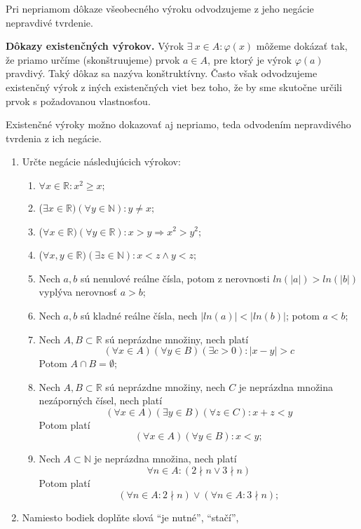 Pri nepriamom dôkaze všeobecného výroku odvodzujeme z jeho negácie nepravdivé tvrdenie.

\textbf{Dôkazy existenčných výrokov.} Výrok $\exists ~ x \in A: \varphi (x)$
môžeme dokázať tak, že priamo určíme (skonštruujeme) prvok $a \in A$, pre ktorý
je výrok $\varphi (a)$ pravdivý. Taký dôkaz sa nazýva konštruktívny. Často však
odvodzujeme existenčný výrok z iných existenčných viet bez toho, že by sme
skutočne určili prvok s požadovanou vlastnosťou.

Existenčné výroky možno dokazovať aj nepriamo, teda odvodením nepravdivého
tvrdenia z ich negácie.

\begin{enumerate}
  \item Určte negácie následujúcich výrokov:
  \begin{enumerate}[label=\arabic*.]
    \item $\forall x \in \mathbb{R} : x^2 \geq x;$
    \item ($\exists x \in \mathbb{R})(\forall y \in \mathbb{N}): y \neq x;$
    \item ($\forall x \in \mathbb{R})(\forall y \in \mathbb{R}):
          x > y \Rightarrow x^2 > y^2;$
    \item ($\forall x, y \in \mathbb{R})(\exists z \in \mathbb{N}):
          x < z \land y < z;$
    \item Nech $a, b$ sú nenulové reálne čísla, potom z nerovnosti
          $ln(|a|) > ln(|b|)$ vyplýva nerovnosť $a > b$;
    \item Nech $a, b$ sú kladné reálne čísla, nech $|ln(a)| < |ln(b)|$;
          potom $a < b$;
    \item Nech $A, B \subset \mathbb{R}$ sú neprázdne množiny, nech platí
          $$(\forall x \in A)(\forall y \in B)(\exists c > 0): |x - y| > c$$
          Potom $A \cap B = \emptyset$;
    \item Nech $A, B \subset \mathbb{R}$ sú neprázdne množiny, nech $C$ je
          neprázdna množina nezáporných čísel, nech platí
          $$(\forall x \in A)(\exists y \in B)(\forall z \in C): x + z < y$$
          Potom platí
          $$(\forall x \in A)(\forall y \in B): x < y;$$
    \item Nech $A \subset \mathbb{N}$ je neprázdna množina, nech platí
          $$\forall n \in A: (2 \nmid n \lor 3 \nmid n)$$
          Potom platí
          $$(\forall n \in A: 2 \nmid n) \lor (\forall n \in A: 3 \nmid n);$$
  \end{enumerate}
  \item Namiesto bodiek doplňte slová \enquote{je nutné}, \enquote{stačí},

\end{enumerate}

